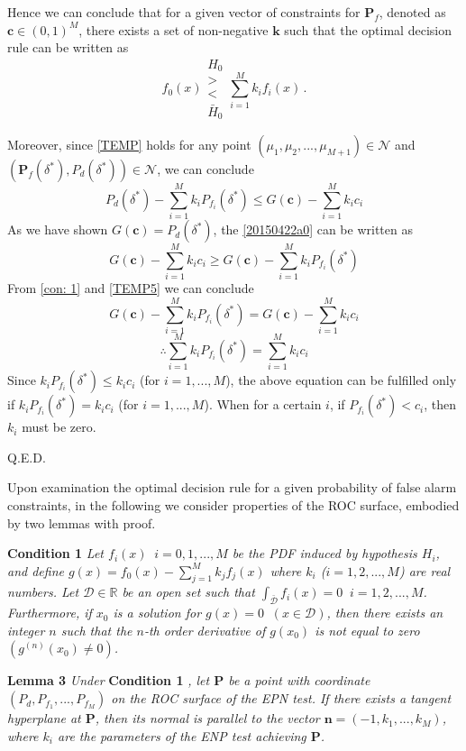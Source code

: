 Hence we can conclude that for a given vector of constraints for $\mathbf{P}_f$, denoted as $\mathbf{c} \in (0, 1)^M$, there exists a set of non-negative $\mathbf{k}$ such that 
the optimal decision rule can be written as 
\[
f_0(x) \substack{H_0 \\ > \\ < \\ \bar{H}_0 } \sum_{i=1}^{M}k_if_i(x)\,.
\]

Moreover, since \eqref{TEMP} holds for any point $(\mu_1, \mu_2, ..., \mu_{M+1}) \in \mathcal{N}$ and $(\mathbf{P}_f(\delta^\ast), P_d(\delta^\ast)) \in \mathcal{N}$, we can conclude 
\begin{equation}
P_d(\delta^\ast) - \sum_{i=1}^{M}k_iP_{f_i}(\delta^\ast) \leq G(\mathbf{c}) - \sum_{i=1}^{M}k_ic_i
\label{20150422a0}
\end{equation}
As we have shown $G(\mathbf{c}) = P_d(\delta^\ast)$, the \eqref{20150422a0} can be written as
\begin{equation}
 G(\mathbf{c}) - \sum_{i=1}^{M}k_ic_i \geq G(\mathbf{c}) - \sum_{i=1}^{M}k_iP_{f_i}(\delta^\ast)
\label{TEMP5}
\end{equation}
From \eqref{con: 1} and \eqref{TEMP5}  we can conclude
\[
G(\mathbf{c}) - \sum_{i=1}^{M}k_iP_{f_i}(\delta^\ast) =  G(\mathbf{c}) - \sum_{i=1}^{M}k_ic_i
\]
\[
\therefore  \sum_{i=1}^{M}k_iP_{f_i}(\delta^\ast) =  \sum_{i=1}^{M}k_ic_i
\]
Since $k_iP_{f_i}(\delta^\ast) \leq k_ic_i$ (for $i=1, ..., M$), the above equation can be fulfilled only if $k_iP_{f_i}(\delta^\ast) = k_ic_i$ (for $i=1, ..., M$). When for a certain $i$, if $P_{f_i}(\delta^\ast) < c_i$, then $k_i$ must be zero.

Q.E.D.

Upon examination  the optimal decision rule for a given probability of false alarm constraints, in the following we consider properties of the ROC surface, embodied by two lemmas with proof.  

\noindent \textbf{Condition 1}
\textit{
\noindent Let $f_i(x) \;\;i=0, 1, ..., M$ be the PDF induced by hypothesis $H_i$, and define $g(x) = f_0(x) - \sum_{j=1}^{M} k_jf_j(x)$ where $k_i$  ($i = 1, 2, ..., M$) are real numbers. Let $\mathcal{D} \in \mathbb{R}$ be an open set such that $\int_{\bar{\mathcal{D}}}f_i(x)=0\;\;i = 1, 2, ..., M$. Furthermore,  if $x_0$ is a solution  for $g(x) = 0 \;\;(x \in \mathcal{D})$, then there exists an integer $n$ such that  the $n$-th order derivative of $g(x_0)$ is not equal to zero $(g^{(n)}(x_0) \neq 0)$.
}

\noindent \textbf{Lemma 3}
\textit{
\noindent Under}
\textbf{Condition 1}
\textit{, let $\mathbf{P}$ be a point with coordinate $(P_d, P_{f_1}, ..., P_{f_M})$ on the ROC surface of the EPN test. If there exists a tangent hyperplane at $\mathbf{P}$, then its normal is parallel to the vector $\mathbf{n} = (-1, k_1, ..., k_M)$, where $k_i$ are the parameters of the ENP test achieving $\mathbf{P}$.
}

